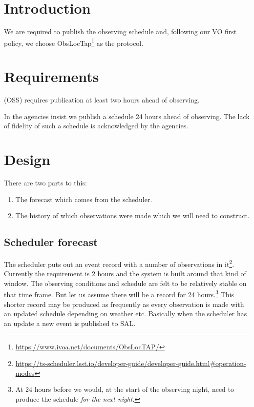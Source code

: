 \def\DB{ObsLocTAP database }

\section{Introduction}
We are required to publish the observing schedule and, following our VO first policy, we  choose ObsLocTap\footnote{\url{https://www.ivoa.net/documents/ObsLocTAP/}} as the protocol.

\section{Requirements}

 (OSS) requires publication at least two hours ahead of observing.

In  the agencies insist we publish a schedule 24 hours ahead of observing.
The lack of fidelity of such a schedule is acknowledged by the agencies.



\section{Design}


There are two parts to this:


\begin{enumerate}
\item The forecast  which comes from the scheduler.
\item The history of which observations were made which we will need to construct.
\end{enumerate}

\subsection{Scheduler forecast} \label{sec:forecast}
The scheduler puts out an event record with a number of observations in it\footnote{\url{https://ts-scheduler.lsst.io/developer-guide/developer-guide.html\#operation-modes}}.
Currently the requirement is 2 hours and the system is built around that kind of window.
The observing conditions and schedule are felt to be relatively stable on that time frame.
But let us assume there will be  a record for 24 hours.\footnote{
At 24 hours before we would, at the start of the observing night, need to produce the schedule  \emph{for the next night}.
}
This shorter record may be produced as frequently as every observation is made with an updated schedule depending on weather etc.
Basically when the scheduler has an update a new event is published to SAL.

